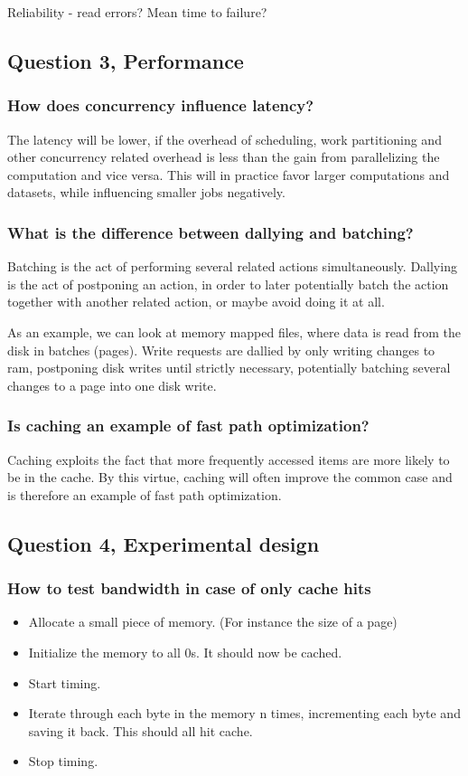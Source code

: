 \documentclass[11pt,a4paper]{article}
\begin{document}
Reliability - read errors? Mean time to failure?


\subsection{Question 3, Performance}
\subsubsection{How does concurrency influence latency?}

The latency will be lower, if the overhead of scheduling, work partitioning and
other concurrency related overhead is less than the gain from parallelizing the
computation and vice versa. This will in practice favor larger computations and
datasets, while influencing smaller jobs negatively.

\subsubsection{What is the difference between dallying and batching?}

Batching is the act of performing several related actions simultaneously.
Dallying is the act of postponing an action, in order to later potentially batch
the action together with another related action, or maybe avoid doing it at all.

As an example, we can look at memory mapped files, where data is read from the
disk in batches (pages).
Write requests are dallied by only writing changes to ram, postponing disk
writes until strictly necessary, potentially batching several changes to a page
into one disk write.

\subsubsection{Is caching an example of fast path optimization?}

Caching exploits the fact that more frequently accessed items are more likely
to be in the cache. By this virtue, caching will often improve the common case
and is therefore an example of fast path optimization.

\subsection{Question 4, Experimental design}
\subsubsection{How to test bandwidth in case of only cache hits}
\begin{itemize}
    \item Allocate a small piece of memory. (For instance the size of a page)
    \item Initialize the memory to all 0s. It should now be cached.
    \item Start timing.
    \item Iterate through each byte in the memory n times, incrementing each byte
          and saving it back. This should all hit cache.
    \item Stop timing.
\end{itemize}
\end{document}

